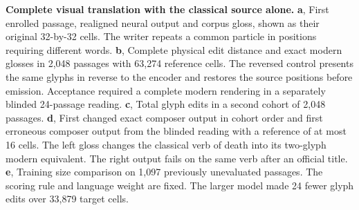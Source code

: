 \textbf{Complete visual translation with the classical source alone.}
\textbf{a}, First enrolled passage, realigned neural output and corpus gloss, shown as their original 32-by-32 cells. The writer repeats a common particle in positions requiring different words. \textbf{b}, Complete physical edit distance and exact modern glosses in 2,048 passages with 63,274 reference cells. The reversed control presents the same glyphs in reverse to the encoder and restores the source positions before emission. Acceptance required a complete modern rendering in a separately blinded 24-passage reading. \textbf{c}, Total glyph edits in a second cohort of 2,048 passages. \textbf{d}, First changed exact composer output in cohort order and first erroneous composer output from the blinded reading with a reference of at most 16 cells. The left gloss changes the classical verb of death into its two-glyph modern equivalent. The right output fails on the same verb after an official title. \textbf{e}, Training size comparison on 1,097 previously unevaluated passages. The scoring rule and language weight are fixed. The larger model made 24 fewer glyph edits over 33,879 target cells.
